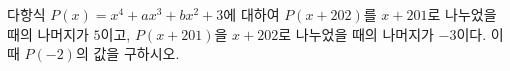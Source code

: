 다항식 $P(x)=x^4+ax^3+bx^2+3$에 대하여 $P(x+202)$를 $x+201$로 나누었을 때의 나머지가 $5$이고, $P(x+201)$을 $x+202$로 나누었을 때의 나머지가 $-3$이다. 이때 $P(-2)$의 값을 구하시오. 

